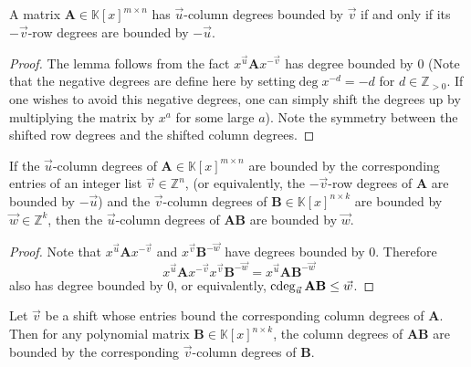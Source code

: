 \begin{lem}
\label{lem:columnDegreesRowDegreesSymmetry}A matrix $\mathbf{A}\in\mathbb{K}\left[x\right]^{m\times n}$
has $\vec{u}$-column degrees bounded by $\vec{v}$ if and only if
its $-\vec{v}$-row degrees are bounded by $-\vec{u}$. %
\begin{comment}
In addition, for a matrix $\mathbf{A}$ with $\vec{u}$-column degrees
$\vec{v}$, it has a full-rank leading $\vec{u}$-column coefficient
matrix if and only if it has a full-rank leading $-\vec{v}$-row coefficient
matrix.
\end{comment}
\end{lem}
\begin{proof}
The lemma follows from the fact $x^{\vec{u}}\mathbf{A}x^{-\vec{v}}$
has degree bounded by 0 (Note that the negative degrees are define
here by setting$\deg x^{-d}=-d$ for $d\in\mathbb{Z}_{>0}$. If one
wishes to avoid this negative degrees, one can simply shift the degrees
up by multiplying the matrix by $x^{a}$ for some large $a$). Note
the symmetry between the shifted row degrees and the shifted column
degrees.\end{proof}
\begin{lem}
\label{lem:productDegreeBound}If the $\vec{u}$-column degrees of
$\mathbf{A}\in\mathbb{K}\left[x\right]^{m\times n}$ are bounded by
the corresponding entries of an integer list $\vec{v}\in\mathbb{Z}^{n}$,
(or equivalently, the $-\vec{v}$-row degrees of $\mathbf{A}$ are
bounded by $-\vec{u}$) and the $\vec{v}$-column degrees of $\mathbf{B}\in\mathbb{K}\left[x\right]^{n\times k}$
are bounded by $\vec{w}\in\mathbb{Z}^{k}$, then the $\vec{u}$-column
degrees of $\mathbf{A}\mathbf{B}$ are bounded by $\vec{w}$. \end{lem}
\begin{proof}
Note that $x^{\vec{u}}\mathbf{A}x^{-\vec{v}}$ and $x^{\vec{v}}\mathbf{B}^{-\vec{w}}$
have degrees bounded by 0. Therefore 
\[
x^{\vec{u}}\mathbf{A}x^{-\vec{v}}x^{\vec{v}}\mathbf{B}^{-\vec{w}}=x^{\vec{u}}\mathbf{A}\mathbf{B}^{-\vec{w}}
\]
 also has degree bounded by 0, or equivalently, $\cdeg_{\vec{u}}\mathbf{A}\mathbf{B}\le\vec{w}$. \end{proof}
\begin{cor}
\label{lem:boundOnDegreesOfFA}Let $\vec{v}$ be a shift whose entries
bound the corresponding column degrees of $\mathbf{A}$. Then for
any polynomial matrix $\mathbf{B}\in\mathbb{K}\left[x\right]^{n\times k}$,
the column degrees of $\mathbf{A}\mathbf{B}$ are bounded %
by the corresponding $\vec{v}$-column degrees of $\mathbf{B}$.\end{cor}
